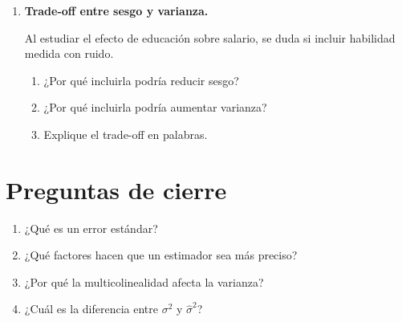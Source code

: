\documentclass[11pt]{article}
\begin{document}
\begin{enumerate}[label=\textbf{Ejercicio \arabic*.}, leftmargin=*]
\begin{enumerate}[label=\alph*)]
    \item Calcule el estadístico \(t\) contra \(H_0:\beta_1=0\) en cada modelo.
    \item ¿Cuál entrega evidencia estadística más fuerte?
    \item Explique la diferencia.
\end{enumerate}

\item \textbf{Trade-off entre sesgo y varianza.}

Al estudiar el efecto de educación sobre salario, se duda si incluir habilidad medida con ruido.

\begin{enumerate}[label=\alph*)]
    \item ¿Por qué incluirla podría reducir sesgo?
    \item ¿Por qué incluirla podría aumentar varianza?
    \item Explique el trade-off en palabras.
\end{enumerate}

\end{enumerate}

\section*{Preguntas de cierre}

\begin{enumerate}[label=\arabic*.]
    \item ¿Qué es un error estándar?
    \item ¿Qué factores hacen que un estimador sea más preciso?
    \item ¿Por qué la multicolinealidad afecta la varianza?
    \item ¿Cuál es la diferencia entre \(\sigma^2\) y \(\hat{\sigma}^2\)?
\end{enumerate}
\end{document}
